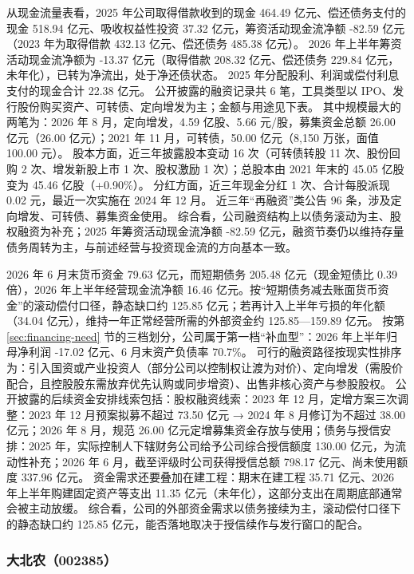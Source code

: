  从现金流量表看，2025 年公司取得借款收到的现金 464.49 亿元、偿还债务支付的现金 518.94 亿元、吸收权益性投资 37.32 亿元，筹资活动现金流净额 -82.59 亿元（2023 年为取得借款 432.13 亿元、偿还债务 485.38 亿元）。 2026 年上半年筹资活动现金流净额为 -13.37 亿元（取得借款 208.32 亿元、偿还债务 229.84 亿元，未年化），已转为净流出，处于净还债状态。 2025 年分配股利、利润或偿付利息支付的现金合计 22.38 亿元。 公开披露的融资记录共 6 笔，工具类型以 IPO、发行股份购买资产、可转债、定向增发为主；金额与用途见下表。 其中规模最大的两笔为：2026 年 8 月，定向增发，4.59 亿股、5.66 元/股，募集资金总额 26.00 亿元（26.00 亿元）；2021 年 11 月，可转债，50.00 亿元（8,150 万张，面值 100.00 元）。 股本方面，近三年披露股本变动 16 次（可转债转股 11 次、股份回购 2 次、增发新股上市 1 次、股权激励 1 次）；总股本由 2021 年末的 45.05 亿股变为 45.46 亿股（+0.90\%）。 分红方面，近三年现金分红 1 次、合计每股派现 0.02 元，最近一次实施在 2024 年 12 月。 近三年“再融资”类公告 96 条，涉及定向增发、可转债、募集资金使用。 综合看，公司融资结构上以债务滚动为主、股权融资为补充；2025 年筹资活动现金流净额 -82.59 亿元，融资节奏仍以维持存量债务周转为主，与前述经营与投资现金流的方向基本一致。

 2026 年 6 月末货币资金 79.63 亿元，而短期债务 205.48 亿元（现金短债比 0.39 倍），2026 年上半年经营现金流净额 16.46 亿元。按“短期债务减去账面货币资金”的滚动偿付口径，静态缺口约 125.85 亿元；若再计入上半年亏损的年化额（34.04 亿元），维持一年正常经营所需的外部资金约 125.85---159.89 亿元。 按第 \ref{sec:financing-need} 节的三档划分，公司属于第一档“补血型”：2026 年上半年归母净利润 -17.02 亿元、6 月末资产负债率 70.7\%。 可行的融资路径按现实性排序为：引入国资或产业投资人（部分公司以控制权让渡为对价）、定向增发（需股价配合，且控股股东需放弃优先认购或同步增资）、出售非核心资产与参股股权。 公开披露的后续资金安排线索包括：股权融资线索：2023 年 12 月，定增方案三次调整：2023 年 12 月预案拟募不超过 73.50 亿元 → 2024 年 8 月修订为不超过 38.00 亿元；2026 年 8 月，规范 26.00 亿元定增募集资金存放与使用；债务与授信安排：2025 年，实际控制人下辖财务公司给予公司综合授信额度 130.00 亿元，为流动性补充；2026 年 6 月，截至评级时公司获得授信总额 798.17 亿元、尚未使用额度 337.96 亿元。 资金需求还要叠加在建工程：期末在建工程 35.71 亿元、2026 年上半年购建固定资产等支出 11.35 亿元（未年化），这部分支出在周期底部通常会被主动放缓。 综合看，公司的外部资金需求以债务接续为主，滚动偿付口径下的静态缺口约 125.85 亿元，能否落地取决于授信续作与发行窗口的配合。




\subsubsection{大北农（002385）}
\label{co:002385}

